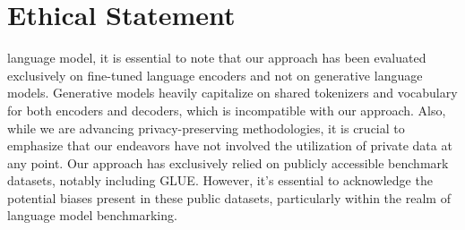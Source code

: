 \documentclass[letterpaper]{article} %
\begin{document}
\section*{Ethical Statement}
\label{sec:ethics}
 language model, it is essential to note that our approach has been evaluated exclusively on fine-tuned language encoders and not on generative language models. Generative models heavily capitalize on shared tokenizers and vocabulary for both encoders and decoders, which is incompatible with our approach. Also, while we are advancing privacy-preserving methodologies, it is crucial to emphasize that our endeavors have not involved the utilization of private data at any point. Our approach has exclusively relied on publicly accessible benchmark datasets, notably including GLUE. However, it's essential to acknowledge the potential biases present in these public datasets, particularly within the realm of language model benchmarking.
\clearpage

\end{document}
